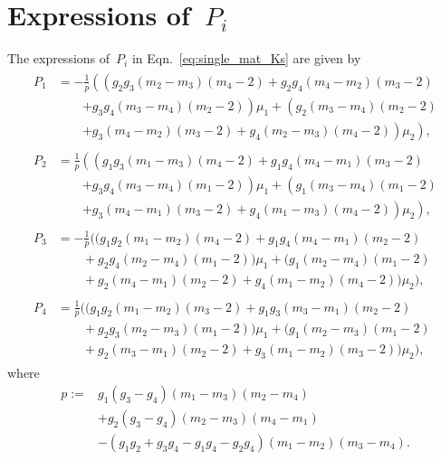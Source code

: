\documentclass[preprint,10pt,times]{elsarticle}
\numberwithin{equation}{section}
\renewcommand{\>}{$\Rightarrow$}
\begin{document}
\section{Expressions of~$P_i$}
\label{Appen:Pi}
The expressions of~$P_i$ in Eqn.~\eqref{eq:single_mat_Ks} are given by
\begin{subequations}
\begin{align}
	\begin{split}
	P_1 & = -\frac{1}{p} \left(\left(g_2 g_3 (m_2 - m_3)(m_4 -2) + g_2 g_4 (m_4 - m_2)(m_3 - 2) \right.\right.\\
	&\qquad{} \left. + g_3 g_4 (m_3 - m_4)(m_2 -2) \right) \mu_1  + \left(g_2 (m_3 - m_4)(m_2 -2) \right. \\
	&\qquad{} \left.\left. + g_3(m_4 - m_2)(m_3 -2) + g_4 (m_2 - m_3)(m_4 -2) \right)\mu_2 \right) ,
	\end{split} \\
	\begin{split}
	P_2 & = \frac{1}{p} \left(\left( g_1 g_3 (m_1 - m_3)(m_4 -2) + g_1 g_4 (m_4 - m_1)(m_3 - 2)\right.\right. \\
	&\qquad{} \left. + g_3 g_4 (m_3 - m_4)(m_1 -2)  \right) \mu_1 + \left(g_1 (m_3 - m_4)(m_1 -2) \right.\\
	&\qquad{} \left.\left. + g_3(m_4 - m_1)(m_3 -2) + g_4 (m_1 - m_3)(m_4 -2)  \right)\mu_2  \right),
	\end{split} \\
	\begin{split}
	P_3 & = -\frac{1}{p} ((g_1 g_2 (m_1 - m_2)(m_4 -2) + g_1 g_4 (m_4 - m_1)(m_2 - 2) \\ &\qquad{} + g_2 g_4 (m_2 - m_4)(m_1 -2) ) \mu_1 + (g_1 (m_2 - m_4)(m_1 -2) \\  &\qquad{} + g_2(m_4 - m_1)(m_2 -2) + g_4 (m_1 - m_2)(m_4 -2))\mu_2),
	\end{split} \\
	\begin{split}
	P_4 & = \frac{1}{p} ((g_1 g_2 (m_1 - m_2)(m_3 -2) + g_1 g_3 (m_3 - m_1)(m_2 - 2) \\ &\qquad{} + g_2 g_3 (m_2 - m_3)(m_1 -2)) \mu_1 +  (g_1 (m_2 - m_3)(m_1 -2) \\  &\qquad{} + g_2(m_3 - m_1)(m_2 -2) + g_3 (m_1 - m_2)(m_3 -2))\mu_2),
	\end{split}
	\end{align}
\end{subequations}
where
\begin{equation}
	\begin{aligned}
	p := & g_1(g_3 - g_4)(m_1 - m_3)(m_2 - m_4) \\
	 	& + g_2(g_3 - g_4)(m_2 - m_3)(m_4 - m_1) \\
	 	& - (g_1 g_2 + g_3 g_4 - g_1 g_4 - g_2 g_4)(m_1 - m_2)(m_3 - m_4).
	\end{aligned}
\end{equation}
\end{document}
